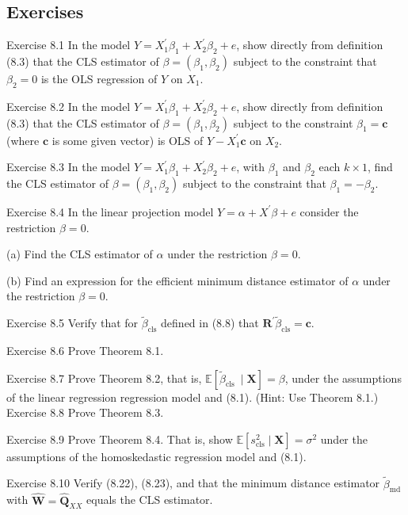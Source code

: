 \documentclass[10pt]{article}
\begin{document}
\subsection{Exercises}
Exercise 8.1 In the model $Y=X_{1}^{\prime} \beta_{1}+X_{2}^{\prime} \beta_{2}+e$, show directly from definition (8.3) that the CLS estimator of $\beta=\left(\beta_{1}, \beta_{2}\right)$ subject to the constraint that $\beta_{2}=0$ is the OLS regression of $Y$ on $X_{1}$.

Exercise 8.2 In the model $Y=X_{1}^{\prime} \beta_{1}+X_{2}^{\prime} \beta_{2}+e$, show directly from definition (8.3) that the CLS estimator of $\beta=\left(\beta_{1}, \beta_{2}\right)$ subject to the constraint $\beta_{1}=\boldsymbol{c}$ (where $\boldsymbol{c}$ is some given vector) is OLS of $Y-X_{1}^{\prime} \boldsymbol{c}$ on $X_{2}$.

Exercise 8.3 In the model $Y=X_{1}^{\prime} \beta_{1}+X_{2}^{\prime} \beta_{2}+e$, with $\beta_{1}$ and $\beta_{2}$ each $k \times 1$, find the CLS estimator of $\beta=\left(\beta_{1}, \beta_{2}\right)$ subject to the constraint that $\beta_{1}=-\beta_{2}$.

Exercise 8.4 In the linear projection model $Y=\alpha+X^{\prime} \beta+e$ consider the restriction $\beta=0$.

(a) Find the CLS estimator of $\alpha$ under the restriction $\beta=0$.

(b) Find an expression for the efficient minimum distance estimator of $\alpha$ under the restriction $\beta=0$.

Exercise 8.5 Verify that for $\widetilde{\beta}_{\mathrm{cls}}$ defined in (8.8) that $\boldsymbol{R}^{\prime} \widetilde{\beta}_{\mathrm{cls}}=\boldsymbol{c}$.

Exercise 8.6 Prove Theorem 8.1.

Exercise 8.7 Prove Theorem 8.2, that is, $\mathbb{E}\left[\widetilde{\beta}_{\text {cls }} \mid \boldsymbol{X}\right]=\beta$, under the assumptions of the linear regression regression model and (8.1). (Hint: Use Theorem 8.1.) Exercise 8.8 Prove Theorem 8.3.

Exercise 8.9 Prove Theorem 8.4. That is, show $\mathbb{E}\left[s_{\mathrm{cls}}^{2} \mid \boldsymbol{X}\right]=\sigma^{2}$ under the assumptions of the homoskedastic regression model and (8.1).

Exercise 8.10 Verify (8.22), (8.23), and that the minimum distance estimator $\widetilde{\beta}_{\mathrm{md}}$ with $\widehat{\boldsymbol{W}}=\widehat{\boldsymbol{Q}}_{X X}$ equals the CLS estimator.
\end{document}
